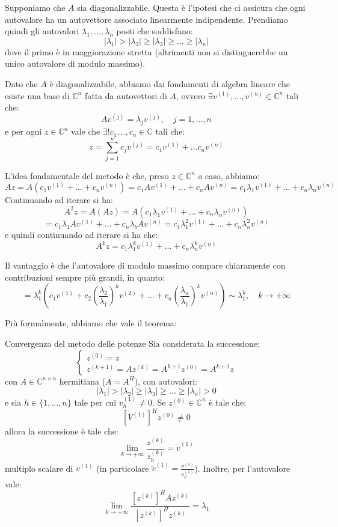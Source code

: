 \documentclass[a4paper,11pt]{article}
\begin{document}
Supponiamo che $A$ sia diagonalizzabile.
Questa è l'ipotesi che ci assicura che ogni autovalore ha un autovettore associato linearmente indipendente.
Prendiamo quindi gli autovalori $\lambda_1, ..., \lambda_n$ posti che soddisfano:
$$
|\lambda_1| > |\lambda_2| \geq |\lambda_3| \geq ... \geq |\lambda_n|
$$
dove il primo è in maggiorazione stretta (altrimenti non si distinguerebbe un unico autovalore di modulo massimo).

Dato che $A$ è diagonalizzabile, abbiamo dai fondamenti di algebra lineare che esiste una base di $\mathbb{C}^n$ fatta da autovettori di $A$, ovvero $\exists v^{(1)}, ..., v^{(n)} \in \mathbb{C}^n$ tali che:
$$
A v^{(j)} = \lambda_j v^{(j)}, \quad j = 1, ..., n
$$
e per ogni $z \in \mathbb{C}^n$ vale che $\exists ! c_1, .., c_n \in \mathbb{C}$ tali che:
$$
z = \sum_{j = 1}^n c_j v^{(j)} = c_1 v^{(1)} + ... c_n v^{(n)}
$$

\par\smallskip

L'idea fondamentale del metodo è che, preso $z \in \mathbb{C}^n$ a caso, abbiamo:
$$
A z = A (c_1 v^{(1)} + ... + c_n v^{(n)}) = c_1 A v^{(1)} + ... + c_n A v^{(n)} = c_1 \lambda_1 v^{(1)} + ... + c_n \lambda_n v^{(n)}
$$
Continuando ad iterare si ha:
$$
A^2 z = A (Az) = A (c_1 \lambda_1 v^{(1)} + ... + c_n \lambda_n v^{(n)})
$$
$$
= c_1 \lambda_1 A v^{(1)} + ... + c_n \lambda_b A v^{(n)} = c_1 \lambda_1^2 v^{(1)} + ... + c_n \lambda_n^2 v^{(n)}
$$
e quindi continuando ad iterare si ha che:
$$
A^k z = c_1 \lambda_1^k v^{(1)} + ... + c_n \lambda_n^k v^{(n)}
$$

Il vantaggio è che l'autovalore di modulo massimo compare chiaramente con contribuzioni sempre più grandi, in quanto:
$$
= \lambda_1^k \left( c_1 v^{(1)} + c_2 \left( \frac{\lambda_2}{\lambda_1} \right)^k v^{(2)} + ... + c_n \left( \frac{\lambda_n}{\lambda_1} \right)^k v^{(n)} \right) \sim \lambda_1^k, \quad k \rightarrow + \infty
$$

Più formalmente, abbiamo che vale il teorema:
\begin{theorem}{Convergenza del metodo delle potenze}
	Sia considerata la successione:
	\[
		\begin{cases}
			z^{(0)} = z \\
			z^{(k + 1)} = Az^{(k)} = A^{k + 1} z^{(0)} = A^{k + 1} z
		\end{cases}
	\]
	con $A \in \mathbb{C}^{n \times n}$ hermitiana ($A = A^H$), con autovalori:
	$$
	|\lambda_1| > |\lambda_2| \geq |\lambda_3| \geq ... \geq |\lambda_n| > 0
	$$
	e sia $h \in \{1, ..., n\}$ tale per cui $v_h^{(1)} \neq 0$.
	Se $z^{(0)} \in \mathbb{C}^n$ è tale che:
	$$
	\left[V^{(1)}\right]^H z^{(0)} \neq 0
	$$
	allora la successione è tale che:
	$$
	\lim_{k \rightarrow +\infty} \frac{z^{(k)}}{z_h^{(k)}} = \tilde{v}^{(1)}
	$$
	multiplo scalare di $v^{(1)}$ (in particolare $\tilde{v}^{(1)} = \frac{v^{(1)}}{v_h^{(1)}}$).
	Inoltre, per l'autovalore vale:
	$$
	\lim_{k \rightarrow +\infty} \frac{\left[ z^{(k)} \right]^H A z^{(k)}}{\left[ z^{(k)} \right]^H z^{(k)}} = \lambda_1
	$$
\end{theorem}
\end{document}
